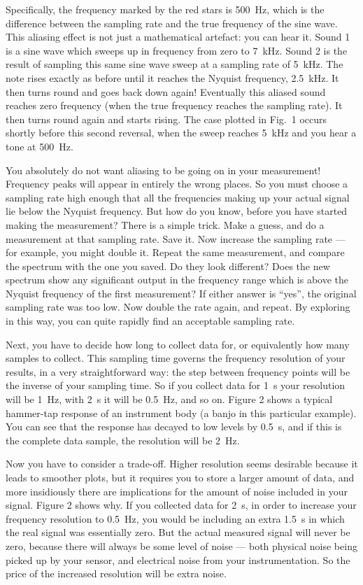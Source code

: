  Specifically, the frequency marked by the red stars is 500~Hz, which is the 
  difference between the sampling rate and the true frequency of the sine wave. 
  This aliasing effect is not just a mathematical artefact: you can hear it. 
  Sound 1 is a sine wave which sweeps up in frequency from zero to 7~kHz. Sound 
  2 is the result of sampling this same sine wave sweep at a sampling rate of 
  5~kHz. The note rises exactly as before until it reaches the Nyquist 
  frequency, 2.5~kHz. It then turns round and goes back down again! Eventually 
  this aliased sound reaches zero frequency (when the true frequency reaches 
  the sampling rate). It then turns round again and starts rising. The case 
  plotted in Fig.\ 1 occurs shortly before this second reversal, when the sweep 
  reaches 5~kHz and you hear a tone at 500~Hz. 

  You absolutely do not want aliasing to be going on in your measurement! 
  Frequency peaks will appear in entirely the wrong places. So you must choose 
  a sampling rate high enough that all the frequencies making up your actual 
  signal lie below the Nyquist frequency. But how do you know, before you have 
  started making the measurement? There is a simple trick. Make a guess, and do 
  a measurement at that sampling rate. Save it. Now increase the sampling rate 
  — for example, you might double it. Repeat the same measurement, and compare 
  the spectrum with the one you saved. Do they look different? Does the new 
  spectrum show any significant output in the frequency range which is above 
  the Nyquist frequency of the first measurement? If either answer is “yes”, 
  the original sampling rate was too low. Now double the rate again, and 
  repeat. By exploring in this way, you can quite rapidly find an acceptable 
  sampling rate. 

  Next, you have to decide how long to collect data for, or equivalently how 
  many samples to collect. This sampling time governs the frequency resolution 
  of your results, in a very straightforward way: the step between frequency 
  points will be the inverse of your sampling time. So if you collect data for 
  1~s your resolution will be 1~Hz, with 2~s it will be 0.5~Hz, and so on. 
  Figure 2 shows a typical hammer-tap response of an instrument body (a banjo 
  in this particular example). You can see that the response has decayed to low 
  levels by 0.5~s, and if this is the complete data sample, the resolution will 
  be 2~Hz. 

  Now you have to consider a trade-off. Higher resolution seems desirable 
  because it leads to smoother plots, but it requires you to store a larger 
  amount of data, and more insidiously there are implications for the amount of 
  noise included in your signal. Figure 2 shows why. If you collected data for 
  2~s, in order to increase your frequency resolution to 0.5~Hz, you would be 
  including an extra 1.5~s in which the real signal was essentially zero. But 
  the actual measured signal will never be zero, because there will always be 
  some level of noise — both physical noise being picked up by your sensor, and 
  electrical noise from your instrumentation. So the price of the increased 
  resolution will be extra noise. 

